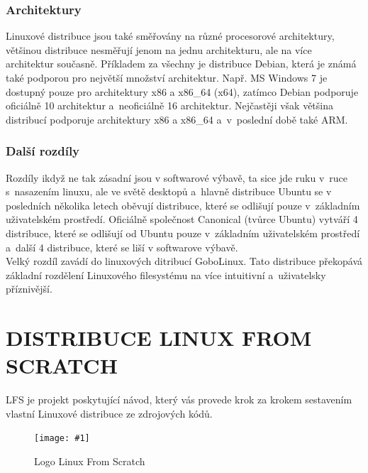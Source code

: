 \documentclass[a4paper,12pt]{article}
\newcommand{\upc}[1]{\uppercase{#1}}
\newcommand{\obr}[3]{%
	\begin{figure}[h]
	\center\texttt{[image: \#1]}
	\caption{#3}
	\end{figure}
	}
\begin{document}
\subsubsection{Architektury}
Linuxové distribuce jsou také směřovány na různé procesorové architektury, většinou distribuce nesměřují jenom na jednu architekturu, ale na více architektur současně. Příkladem za všechny je distribuce Debian, která je známá také podporou pro největší množství architektur. Např. MS Windows 7 je dostupný pouze pro architektury x86 a x86\_64 (x64), zatímco Debian podporuje oficiálně 10 architektur a~neoficiálně 16 architektur. Nejčastěji však většina distribucí podporuje architektury x86 a x86\_64 a~v~poslední době také ARM.

\subsubsection{Další rozdíly}
Rozdíly ikdyž ne tak zásadní jsou v softwarové výbavě, ta sice jde ruku v~ruce s~nasazením linuxu, ale ve světě desktopů a~hlavně distribuce Ubuntu se v posledních několika letech oběvují distribuce, které se odlišují pouze v~základním uživatelském prostředí. Oficiálně  společnost Canonical (tvůrce Ubuntu) vytváří 4 distribuce, které se odlišují od Ubuntu pouze v~základním uživatelském prostředí a~další 4 distribuce, které se liší v softwarove výbavě.
%
%
\\
Velký rozdíl zavádí do linuxových ditribucí GoboLinux. Tato distribuce překopává základní rozdělení Linuxového filesystému na více intuitivní a~uživatelsky příznivější.
%
%

\section{\upc{Distribuce Linux from scratch}}
LFS je projekt poskytující návod, který vás provede krok za krokem sestavením vlastní Linuxové distribuce ze zdrojových kódů.~\cite{LFSwMAIN}
\obr{./img/lfs-logo.png}{1}{Logo Linux From Scratch}
\end{document}
